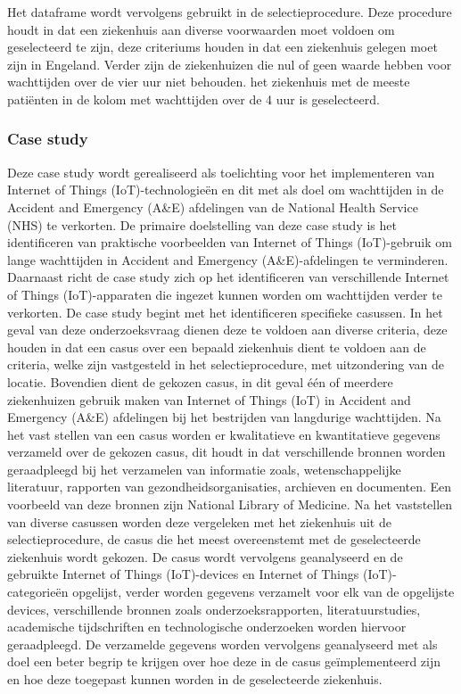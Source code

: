 Het dataframe wordt vervolgens gebruikt in de selectieprocedure. Deze procedure houdt in dat een ziekenhuis aan diverse voorwaarden moet voldoen om geselecteerd te zijn, deze criteriums houden in dat een ziekenhuis gelegen moet zijn in Engeland. Verder zijn de ziekenhuizen die nul of geen waarde hebben voor wachttijden over de vier uur niet behouden. het ziekenhuis met de meeste patiënten in de kolom met wachttijden over de 4 uur is geselecteerd.

\subsubsection*{Case study}
Deze case study wordt gerealiseerd als toelichting voor het implementeren van Internet of Things (IoT)-technologieën en dit met als doel om wachttijden in de Accident and Emergency (A\&E) afdelingen van de National Health Service (NHS) te verkorten. De primaire doelstelling van deze case study is het identificeren van praktische voorbeelden van Internet of Things (IoT)-gebruik om lange wachttijden in Accident and Emergency (A\&E)-afdelingen te verminderen. Daarnaast richt de case study zich op het identificeren van verschillende Internet of Things (IoT)-apparaten die ingezet kunnen worden om wachttijden verder te verkorten. De case study begint met het identificeren specifieke casussen. In het geval van deze onderzoeksvraag dienen deze te voldoen aan diverse criteria, deze houden in dat een casus over een bepaald ziekenhuis dient te voldoen aan de criteria, welke zijn vastgesteld in het selectieprocedure, met uitzondering van de locatie. Bovendien dient de gekozen casus, in dit geval één of meerdere ziekenhuizen gebruik maken van Internet of Things (IoT) in Accident and Emergency (A\&E) afdelingen bij het bestrijden van langdurige wachttijden. Na het vast stellen van een casus worden er kwalitatieve en kwantitatieve gegevens verzameld over de gekozen casus, dit houdt in dat verschillende bronnen worden geraadpleegd bij het verzamelen van informatie zoals, wetenschappelijke literatuur, rapporten van gezondheidsorganisaties, archieven en documenten. Een voorbeeld van deze bronnen zijn National Library of Medicine. Na het vaststellen van diverse casussen worden deze vergeleken met het ziekenhuis uit de selectieprocedure, de casus die het meest overeenstemt met de geselecteerde ziekenhuis wordt gekozen. De casus wordt vervolgens geanalyseerd en de gebruikte Internet of Things (IoT)-devices en Internet of Things (IoT)-categorieën opgelijst, verder worden gegevens verzamelt voor elk van de opgelijste devices, verschillende bronnen zoals onderzoeksrapporten, literatuurstudies, academische tijdschriften en technologische onderzoeken worden hiervoor geraadpleegd. De verzamelde gegevens worden vervolgens geanalyseerd met als doel een beter begrip te krijgen over hoe deze in de casus geïmplementeerd zijn en hoe deze toegepast kunnen worden in de geselecteerde ziekenhuis. 


